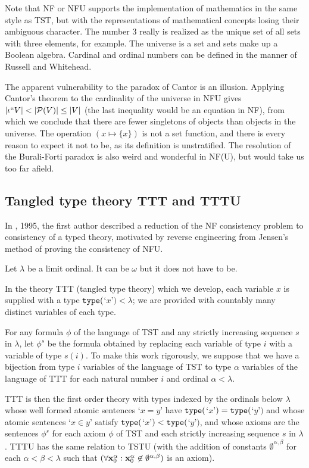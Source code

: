\documentclass[112pt]{article}
\begin{document}
Note that NF or NFU supports the implementation of mathematics in the same style as TST, but with the representations of mathematical concepts losing their ambiguous character.  The number 3 really is realized as the unique set of all sets with three elements, for example.  The universe is a set and sets make up a Boolean algebra.   Cardinal and ordinal numbers can be defined
in the manner of Russell and Whitehead.

The apparent vulnerability to the paradox of Cantor is an illusion.  Applying Cantor's theorem to the cardinality of the universe in NFU gives $|\iota``V| < |{\cal P}(V)| \leq |V|$ (the last inequality would be an equation in NF), from which we conclude that there are fewer singletons of objects than objects in the universe.  The operation $(x \mapsto \{x\})$ is not a set function, and there is every reason to expect it not to be, as its definition is unstratified.  The resolution of the Burali-Forti paradox is also weird and wonderful in NF(U), but would take us too far afield.

\newpage

\subsection{Tangled type theory TTT and TTTU}

In \cite{tangled}, 1995, the first author described a reduction of the NF consistency problem to consistency of a typed theory,  motivated by reverse engineering from Jensen's method of proving the consistency of NFU.

Let $\lambda$ be a limit ordinal.  It can be $\omega$ but it does not have to be.  

In the theory TTT (tangled type theory) which we develop, each variable $x$ is supplied with a type ${\tt type}($`$x$'$) <\lambda$;  we are provided with countably many distinct variables of each type.

For any formula $\phi$ of the language of TST and any strictly increasing sequence $s$ in $\lambda$, let $\phi^s$ be the formula obtained by replacing each variable
of type $i$ with a variable of type $s(i)$.  To make this work rigorously, we suppose that we have a bijection from type $i$ variables of the language of TST to type $\alpha$ variables
of the language of TTT for each natural number $i$ and ordinal $\alpha<\lambda$.

TTT is then the first order theory with types indexed by the ordinals below $\lambda$ whose well formed atomic sentences `$x=y$' have ${\tt type}($`$x$'$) = {\tt type}($`$y$'$)$ and whose atomic sentences `$x \in y$' satisfy ${\tt type}($`$x$'$) < {\tt type}($`$y$'$)$, and whose axioms are the sentences $\phi^s$ for each axiom $\phi$ of TST and each strictly increasing sequence $s$ in $\lambda$.  TTTU has the same relation to TSTU (with the addition of constants $\emptyset^{\alpha,\beta}$ for each $\alpha<\beta<\lambda$  such that $(\forall {\bf x}_0^{\alpha} :{\bf x}_0^{\alpha}\not\in \emptyset^{\alpha,\beta})$ is an axiom).
\end{document}
